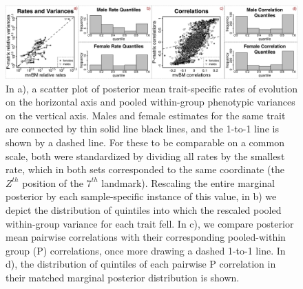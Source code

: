 \documentclass[10pt, twocolumn, twoside]{article}
\begin{document}
\begin{figure}[h]
\centering
\includegraphics[width=160mm]{figures/harvati_figure5_final.pdf}
\caption[Evaluating Cheverud's Conjecture: Does an Inferred Rate Matrix Resemble Within-Group Patterns of Variation and Covariation?]{In a), a scatter plot of posterior mean trait-specific rates of evolution on the horizontal axis and pooled within-group phenotypic variances on the vertical axis. Males and female estimates for the same trait are connected by thin solid line black lines, and the 1-to-1 line is shown by a dashed line. For these to be comparable on a common scale, both were standardized by dividing all rates by the smallest rate, which in both sets corresponded to the same coordinate (the $Z^{th}$ position of the $7^{th}$ landmark). Rescaling the entire marginal posterior by each sample-specific instance of this value, in b) we depict the distribution of quintiles into which the rescaled pooled within-group variance for each trait fell. In c), we compare posterior mean pairwise correlations with their corresponding pooled-within group (P) correlations, once more drawing a dashed 1-to-1 line. In d), the distribution of quintiles of each pairwise P correlation in their matched marginal posterior distribution is shown.  \label{overflow}
\label{fig:harvatiFigure5}}
\end{figure}
\end{document}
